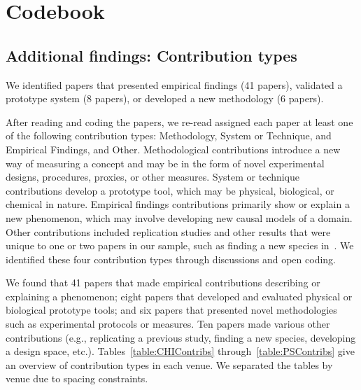 
\section{Codebook}
\tableLitSurveyCodes

\subsection{Additional findings: Contribution types}
We identified papers that presented empirical findings (41 papers), validated a
prototype system (8 papers), or developed a new methodology (6 papers). 

After reading and coding the papers, we re-read assigned each paper at least one
of the following contribution types: Methodology, System or Technique, and
Empirical Findings, and Other. Methodological contributions introduce a new way
of measuring a concept and may be in the form of novel experimental designs,
procedures, proxies, or other measures. System or technique contributions
develop a prototype tool, which may be physical, biological, or chemical in
nature. Empirical findings contributions primarily show or explain a new
phenomenon, which may involve developing new causal models of a domain. Other
contributions included replication studies and other results that were unique to
one or two papers in our sample, such as finding a new species in~\cite{N1}. We
identified these four contribution types through discussions and open coding. 

We found that 41 papers that made empirical contributions describing or
explaining a phenomenon; eight papers that developed and evaluated physical or
biological prototype tools; and six papers that presented novel methodologies
such as experimental protocols or measures. Ten papers made various other
contributions (e.g., replicating a previous study, finding a new species,
developing a design space, etc.). Tables~\ref{table:CHIContribs}
through~\ref{table:PSContribs} give an overview of contribution types in each
venue. We separated the tables by venue due to spacing constraints. 

